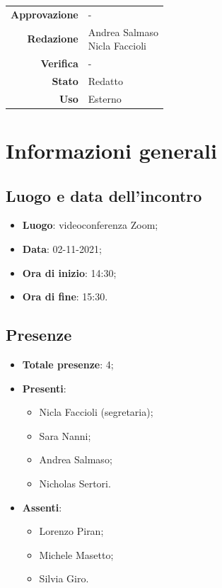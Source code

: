 \documentclass[11pt]{article}
\begin{document}
\begin{titlepage}
\begin{center}
			\large
			
			
			\vfill
			
			\begin{tabular}{r|l}
				\textbf{Approvazione} &  -\\
				\textbf{Redazione} &  \parbox[t]{3.5cm}{Andrea Salmaso \\Nicla Faccioli}\\
				\textbf{Verifica} &  -\\
				\textbf{Stato} & Redatto \\
				\textbf{Uso} & Esterno
			\end{tabular}
			\vfill
			
		\end{center}
	\end{titlepage}

	\newpage

	\section{Informazioni generali}
	\subsection{Luogo e data dell'incontro}
	\begin{itemize}
		\item \textbf{Luogo}: videoconferenza Zoom;
		\item \textbf{Data}: 02-11-2021;
		\item \textbf{Ora di inizio}: 14:30;
		\item \textbf{Ora di fine}: 15:30.
	\end{itemize}
	
	\subsection{Presenze}
	\begin{itemize}
		\item \textbf{Totale presenze}: 4;
		\item \textbf{Presenti}:
		\begin{itemize}
			\item Nicla Faccioli (segretaria);
			\item Sara Nanni;
			\item Andrea Salmaso;
			\item Nicholas Sertori.
		\end{itemize}
		\item \textbf{Assenti}:
		\begin{itemize}
			\item Lorenzo Piran;
			\item Michele Masetto;
			\item Silvia Giro.
		\end{itemize}
	\end{itemize}
\end{document}
